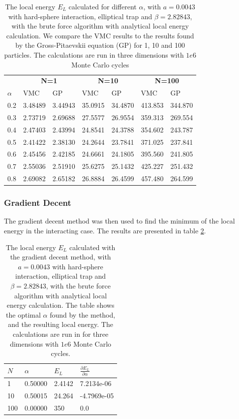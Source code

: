 \documentclass[norsk,a4paper,12pt]{article}
\begin{document}
\begin{table} [H]
	\centering
	\caption{The local energy $E_L$ calculated for different $\alpha$, with $a=0.0043$  with hard-sphere interaction,  elliptical trap and $\beta=2.82843$, with the brute force algorithm with analytical local energy calculation. We compare the VMC results to the results found by the Gross-Pitaevskii equation (GP) for 1, 10 and 100 particles. The calculations are run in three dimensions with $1e6$ Monte Carlo cycles}
	\begin{tabularx}{\textwidth}{X|XXXXXX} \hline
		\label{tab:EL_calc_repulsive_pot}
		& \multicolumn{2}{c}{\textbf{N=1}} & \multicolumn{2}{c}{\textbf{N=10}} & \multicolumn{2}{c}{\textbf{N=100}} \\
		$\alpha$ & VMC & GP & VMC & GP & VMC & GP  \\ \hline
		0.2 & 3.48489 & 3.44943 & 35.0915 & 34.4870 & 413.853 & 344.870\\
		0.3 & 2.73719 & 2.69688 & 27.5577 & 26.9554 & 359.313 & 269.554\\
		0.4 & 2.47403 & 2.43994 & 24.8541 & 24.3788 & 354.602 & 243.787\\ 
		0.5 & 2.41422 & 2.38130 & 24.2644 & 23.7841 & 371.025 & 237.841\\ 
		0.6 & 2.45456 & 2.42185 & 24.6661 & 24.1805 & 395.560 & 241.805\\ 
		0.7 & 2.55036 & 2.51910 & 25.6275 & 25.1432 & 425.227 & 251.432\\ 
		0.8 & 2.69082 & 2.65182 & 26.8884 & 26.4599 & 457.480 & 264.599\\ \hline
	\end{tabularx}
\end{table}

\subsubsection{Gradient Decent} \label{sec:gd}
The gradient decent method was then used to find the minimum of the local energy in the interacting case. The results are presented in table \ref{tab:EL_calc_gradientdecent}.

\begin{table} [H]
	\centering
	\caption{The local energy $E_L$ calculated with the gradient decent method, with $a=0.0043$  with hard-sphere interaction,  elliptical trap and $\beta=2.82843$, with the brute force algorithm with analytical local energy calculation. The table shows the optimal $\alpha$ found by the method, and the resulting local energy. The calculations are run in for  three dimensions with $1e6$ Monte Carlo cycles.}
	\begin{tabularx}{\textwidth}{X|XXX} \hline
		\label{tab:EL_calc_gradientdecent}
		$N$ & $\alpha $ & $E_L$  & $\frac{\partial E_L}{\partial \alpha}$   \\ \hline
		1   & 0.50000  & 2.4142  &  7.2134e-06 \\
		10  & 0.50015  & 24.264  & -4.7969e-05 \\ 
		100 & 0.00000  & 350     &  0.0\\ \hline
	\end{tabularx}
\end{table}
\end{document}
